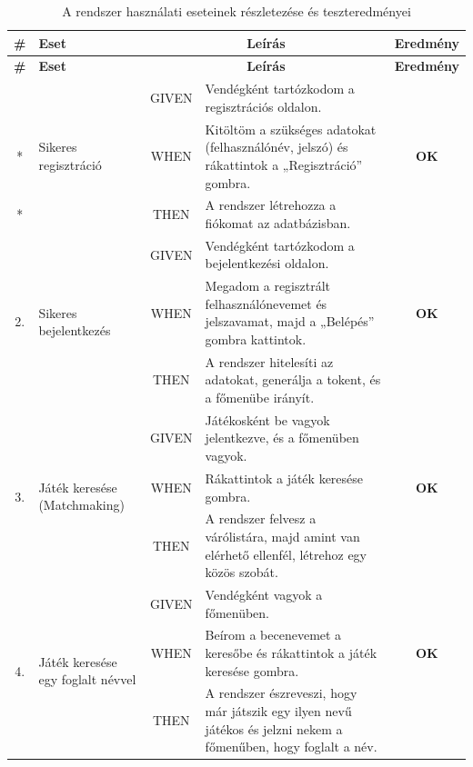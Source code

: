 \begin{longtable}{| c | m{3cm} | c | m{6cm} | c |}
    \caption{A rendszer használati eseteinek részletezése és teszteredményei}
    \label{tab:use-case-scenarios-real} \\
    
    \hline
    \textbf{\#} & \textbf{Eset} & \multicolumn{2}{c|}{\textbf{Leírás}} & \textbf{Eredmény} \\
    \hline
    \endfirsthead
    
    \hline
    \textbf{\#} & \textbf{Eset} & \multicolumn{2}{c|}{\textbf{Leírás}} & \textbf{Eredmény} \\
    \hline
    \endhead

    \hline
    \endlastfoot

    \multirow{3}{*}{1.} & \multirow{3}{3cm}{Sikeres regisztráció} 
    & GIVEN & Vendégként tartózkodom a regisztrációs oldalon. & \cellcolor{green!40} \\* \cline{3-4}
    & & WHEN & Kitöltöm a szükséges adatokat (felhasználónév, jelszó) és rákattintok a „Regisztráció” gombra. & \cellcolor{green!40}\textbf{OK} \\* \cline{3-4}
    & & THEN & A rendszer létrehozza a fiókomat az adatbázisban. & \cellcolor{green!40} \\ \hline

    \multirow{3}{*}{2.} & \multirow{3}{3cm}{Sikeres bejelentkezés} 
    & GIVEN & Vendégként tartózkodom a bejelentkezési oldalon. & \cellcolor{green!40} \\* \cline{3-4}
    & & WHEN & Megadom a regisztrált felhasználónevemet és jelszavamat, majd a „Belépés” gombra kattintok. & \cellcolor{green!40}\textbf{OK} \\* \cline{3-4}
    & & THEN & A rendszer hitelesíti az adatokat, generálja a tokent, és a főmenübe irányít. & \cellcolor{green!40} \\ \hline

    \multirow{3}{*}{3.} & \multirow{3}{3cm}{Játék keresése (Matchmaking)} 
    & GIVEN & Játékosként be vagyok jelentkezve, és a főmenüben vagyok. & \cellcolor{green!40} \\* \cline{3-4}
    & & WHEN & Rákattintok a játék keresése gombra. & \cellcolor{green!40}\textbf{OK} \\* \cline{3-4}
    & & THEN & A rendszer felvesz a várólistára, majd amint van elérhető ellenfél, létrehoz egy közös szobát. & \cellcolor{green!40} \\ \hline

    \multirow{3}{*}{4.} & \multirow{3}{3cm}{Játék keresése egy foglalt névvel} 
    & GIVEN & Vendégként vagyok a főmenüben. & \cellcolor{green!40} \\* \cline{3-4}
    & & WHEN & Beírom a becenevemet a keresőbe és rákattintok a játék keresése gombra. & \cellcolor{green!40}\textbf{OK} \\* \cline{3-4}
    & & THEN & A rendszer észreveszi, hogy már játszik egy ilyen nevű játékos és jelzni nekem a főmenűben, hogy foglalt a név. & \cellcolor{green!40} \\ \hline


\end{longtable}
